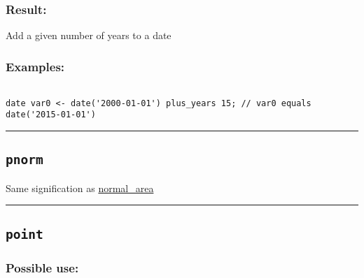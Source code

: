 \documentclass[]{book}
\theoremstyle{definition}
\theoremstyle{definition}
\theoremstyle{definition}
\theoremstyle{remark}
\begin{document}
\subsubsection{Result:}\label{result-393}

Add a given number of years to a date

\subsubsection{Examples:}\label{examples-282}

\begin{verbatim}
 
date var0 <- date('2000-01-01') plus_years 15; // var0 equals date('2015-01-01')
\end{verbatim}

\begin{center}\rule{0.5\linewidth}{\linethickness}\end{center}

\subsection{\texorpdfstring{\texttt{pnorm}}{pnorm}}\label{pnorm}

Same signification as
\href{operators-n-to-r.html\#normal_area}{normal\_area}

\begin{center}\rule{0.5\linewidth}{\linethickness}\end{center}

\subsection{\texorpdfstring{\texttt{point}}{point}}\label{point}

\subsubsection{Possible use:}\label{possible-use-408}
\end{document}

